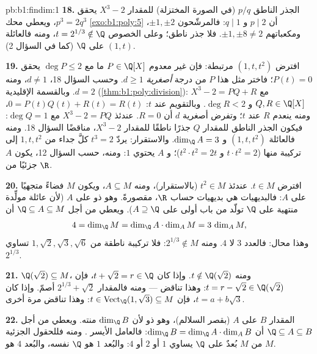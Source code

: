 \begin{solution}{pb:b1:findim:1}
\textbf{18.} الجذر الناطق $p/q$ (في الصورة المختزلة) للمقدار $X^3 - 2$
يحقق $p^3 = 2q^3$، ويعطي محك
\cref{exo:b1:poly:5} أن $p \mid 2$ و $q \mid 1$: فالمرشّحون
$\pm1, \pm2$، ومكعباتهم $\pm1, \pm8 \neq 2$. فلا جذر
ناطق؛ وعلى الخصوص $t = 2^{1/3} \notin \Q$، ومنه فالعائلة $(1, t)$ 
على $\Q$ (كما في السؤال 2).

\textbf{19.} افترض $(1, t, t^2)$ مرتبطة: فإن  غير معدوم $P \in
\Q[X]$ ما مع $\deg P \leq 2$ يحقق $P(t) = 0$؛ فاختر مثل هذا $P$ من
درجة \emph{أصغرية} $d \geq 1$. وحسب السؤال 18، $d \neq 1$، ومنه $d
= 2$. وبالقسمة الإقليدية (\cref{thm:b1:poly:division}): $X^3 - 2
= PQ + R$ مع $Q, R \in \Q[X]$ و $\deg R < 2$. وبالتقويم عند $t$:
$0 = P(t)Q(t) + R(t) = R(t)$، ومنه ينعدم $R$ عند $t$؛ وتفرض أصغرية
$d$ أن $R = 0$. عندئذ $X^3 - 2 = PQ$ مع $\deg Q = 1$: فيكون
الجذر الناطق للمقدار $Q$ جذرًا ناطقًا للمقدار $X^3 - 2$،
مناقضًا السؤال 18. ومنه فالعائلة $(1, t, t^2)$  و
$\dim_\Q A = 3$. والاستقرار: يردّ $t^3 = 2$ كلَّ جداء من
$1, t, t^2$ إلى تركيبة منها ($t\cdot t^2 = 2$ و $t^2\cdot
t^2 = 2t$)؛ و $A$ يحتوي $1$: ومنه، حسب السؤال 12، يكون $A$  جزئيًا
من $\R$.

\textbf{20.} افترض $t \in M$. عندئذ $t^2 \in M$ (بالاستقرار)، ومنه
$A \subseteq M$، ويكون $M$ فضاءً متجهيًا على  $A$:
فالبديهيات هي بديهيات حساب $\R$، مقصورةً. وهو
ذو  على $A$ (لأن عائلة مولِّدة منتهية على $\Q$
تولّد من باب أولى على $A \supseteq \Q$). ويعطي  من أجل
$\Q \subseteq A \subseteq M$ أن
\[
4 = \dim_\Q M = \dim_\Q A \cdot \dim_A M = 3\,\dim_A M ,
\]
وهذا محال: فالعدد $3$ لا  $4$. ومنه $2^{1/3} \notin M$: فلا
تركيبة ناطقة من $1, \sqrt2, \sqrt3, \sqrt6$ تساوي
$2^{1/3}$.

\textbf{21.} $\Q(\sqrt2) \subseteq M$، ومنه $t \notin \Q(\sqrt2)$.
وإذا كان $t + \sqrt2 = r \in \Q$، فإن $t = r - \sqrt2 \in \Q(\sqrt2)$:
وهذا تناقض --- ومنه فالمقدار $2^{1/3} + \sqrt2$ أصمّ. وإذا كان $t = a +
b\sqrt3$، فإن $t \in \operatorname{Vect}_\Q(1, \sqrt3) \subseteq
M$: وهذا تناقض مرة أخرى.

\textbf{22.} المقدار $B$  على  $A$
(بقصر السلالم)، وهو ذو  لأن $\dim_\Q B$
منته. ويعطي  من أجل $\Q \subseteq A \subseteq B$ أن
$\dim_\Q B = \dim_\Q A \cdot \dim_A B$: فالعامل الأيسر .
ومنه فللحقول الجزئية من $M$ بُعدٌ على $\Q$ يساوي $1$ أو $2$ أو $4$:
والبُعد $1$ هو $\Q$ نفسه، والبُعد $4$ هو $M$.


\end{solution}
